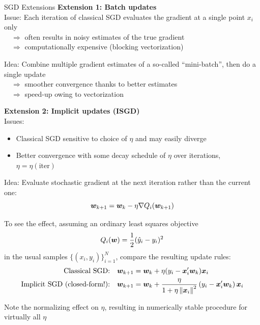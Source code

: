 \begin{frame}{SGD Extensions}
    \textbf{Extension 1: Batch updates} \\
    Issue: Each iteration of classical SGD evaluates the gradient at a single point $x_i$ only\\
    $\quad \Rightarrow $ often results in noisy estimates of the true gradient\\
    $\quad \Rightarrow $ computationally expensive (blocking vectorization)

    Idea: Combine multiple gradient estimates of a so-called ``mini-batch'', then do a single update\\
    $\quad \Rightarrow $ smoother convergence thanks to better estimates \\
    $\quad \Rightarrow $ speed-up owing to vectorization
\end{frame}

\begin{frame}
    \vspace*{5mm}
    \textbf{Extension 2: Implicit updates (ISGD)}\\

    Issues:
    \begin{itemize}
        \item Classical SGD sensitive to choice of $\eta$ and may easily diverge
        \item Better convergence with some decay schedule of $\eta$ over iterations, $\eta = \eta(\text{iter})$
    \end{itemize}

    Idea: Evaluate stochastic gradient at the next iteration rather than the current one:
    $$\bm{w}_{k + 1} = \bm{w}_k - \eta \nabla Q_i(\bm{w}_{k + 1})$$

    To see the effect, assuming an ordinary least squares objective
    $$Q_i(\bm{w}) = \frac12 (\hat y_i - y_i)^2$$
    in the usual samples $\{(x_i, y_i)\}_{i=1}^N$, compare the resulting update rules:
    \begin{align*}
        \text{Classical SGD:}               & \quad \bm{w}_{k + 1} = \bm{w}_k + \eta (y_i - \bm{x}_i' \bm{w}_k) \bm{x}_i \\
        \text{Implicit SGD (closed-form!):} & \quad \bm{w}_{k + 1} =
        \bm{w}_k + \frac{\eta}{1 + \eta \left\|\bm{x}_i\right\|^2} \left(y_i - \bm{x}_i' \bm{w}_k\right) \bm{x}_i
    \end{align*}

    Note the normalizing effect on $\eta$, resulting in numerically stable procedure for virtually all $\eta$
\end{frame}

